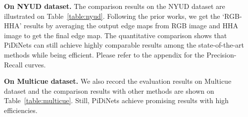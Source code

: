 \documentclass[10pt,twocolumn,letterpaper]{article}
\begin{document}
\vspace{0.3em}
\noindent \textbf{On NYUD dataset.} \quad The comparison results on the NYUD dataset are illustrated on Table~\ref{table:nyud}. Following the prior works, we get the `RGB-HHA' results by averaging the output edge maps from RGB image and HHA image to get the final edge map. The quantitative comparison shows that PiDiNets can still achieve highly comparable results among the state-of-the-art methods while being efficient. Please refer to the appendix for the Precision-Recall curves.

\vspace{0.3em}
\noindent \textbf{On Multicue dataset.} \quad We also record the evaluation results on Multicue dataset and the comparison results with other methods are shown on Table~\ref{table:multicue}. Still, PiDiNets achieve promising results with high efficiencies.
\end{document}
